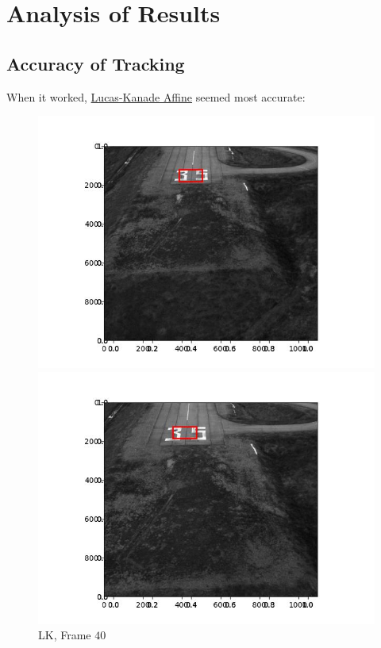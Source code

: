 \section{Analysis of Results}

\subsection{Accuracy of Tracking}

When it worked, \underline{Lucas-Kanade Affine} seemed most accurate:
\begin{figure}[H]
  \centering
  \begin{minipage}{.45\textwidth}
    \centering
    \includegraphics[width=\textwidth]{./figures/lk/landing/frame000040.jpg}
    \caption{LK, Frame $40$}
  \end{minipage}
  \begin{minipage}{.45\textwidth}
    \centering
    \includegraphics[width=\textwidth]{./figures/lk/landing/frame000049.jpg}

\end{minipage}
\end{figure}
